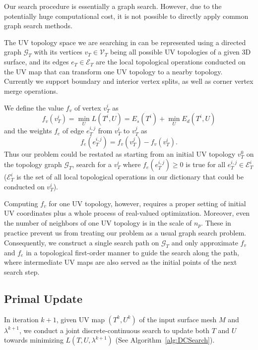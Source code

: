 Our search procedure is essentially a graph search. However, due to the potentially huge computational cost, it is not possible to directly apply common graph search methods.

The UV topology space we are searching in can be represented using a directed graph $\mathcal{G}_T$ with its vertices $v_T \in \mathcal{V}_T$ being all possible UV topologies of a given 3D surface, and its edges $e_T \in \mathcal{E}_T$ are the local topological operations conducted on the UV map that can transform one UV topology to a nearby topology. Currently we support boundary and interior vertex splits, as well as corner vertex merge operations.  

We define the value $f_v$ of vertex $v^i_T$ as 
\[ f_v(v^i_T) = \min_{U} L(T^i, U) = E_s(T^i) + \min_{U} E_d(T^i, U) \]
and the weights $f_e$ of edge $e^{i,j}_{T}$ from $v^i_T$ to $v^j_T$ as 
\[ f_e(e^{i,j}_T) = f_v(v^j_T) - f_v(v^i_T). \]
Thus our problem could be restated as starting from an initial UV topology $v^0_T$ on the topology graph $\mathcal{G}_T$, search for a $v^i_T$ where $f_e(e^{i,j}_T) \geq 0$ is true for all $e^{i,j}_T \in \mathcal{E}^i_T$ ($\mathcal{E}^i_T$ is the set of all local topological operations in our dictionary that could be conducted on $v^i_T$).

Computing $f_v$ for one UV topology, however, requires a proper setting of initial UV coordinates plus a whole process of real-valued optimization. Moreover, even the number of neighbors of one UV topology is in the scale of $n_p$. These in practice prevent us from treating our problem as a usual graph search problem. Consequently, we construct a single search path on $\mathcal{G}_T$ and only approximate $f_v$ and $f_e$ in a topological first-order manner to guide the search along the path, where intermediate UV maps are also served as the initial points of the next search step.

\subsection{Primal Update}
In iteration $k+1$, given UV map $(T^{k}, U^{k})$ of the input surface mesh $M$ and $\lambda^{k+1}$, we conduct a joint discrete-continuous search to update both $T$ and $U$ towards minimizing $L(T,U,\lambda^{k+1})$ (See Algorithm~\ref{alg:DCSearch}).


